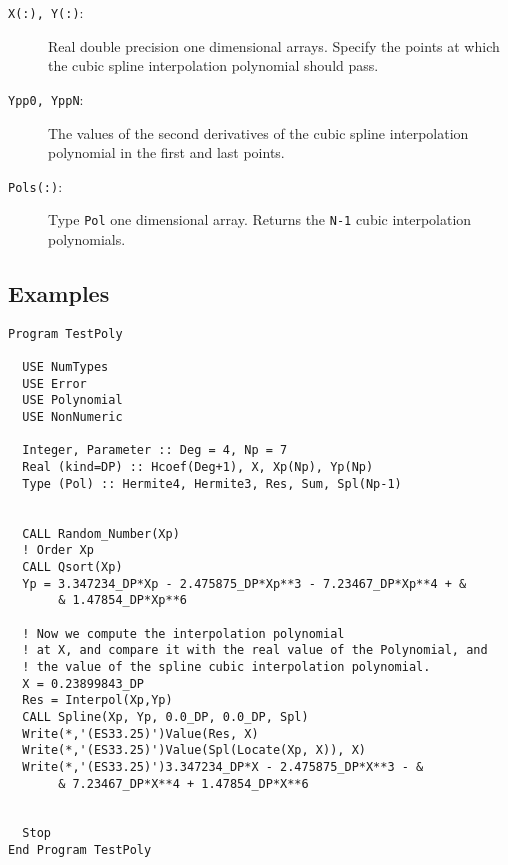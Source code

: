\begin{description}
\item[\texttt{X(:), Y(:)}:] Real double precision one dimensional
  arrays. Specify the points at which the cubic spline interpolation
  polynomial should pass. 
\item[\texttt{Ypp0, YppN}:] The values of the second derivatives of
  the cubic spline interpolation polynomial in the first and last points.
\item[\texttt{Pols(:)}:] Type \texttt{Pol} one dimensional
  array. Returns the \texttt{N-1} cubic interpolation polynomials.
\end{description}

\subsection{Examples}

\begin{lstlisting}[emph=Spline,
                   emphstyle=\color{blue},
                   frame=trBL,
                   caption=Computes the cubic spline interpolation polynomial.,
                   label=spline]
Program TestPoly

  USE NumTypes
  USE Error
  USE Polynomial
  USE NonNumeric

  Integer, Parameter :: Deg = 4, Np = 7
  Real (kind=DP) :: Hcoef(Deg+1), X, Xp(Np), Yp(Np)
  Type (Pol) :: Hermite4, Hermite3, Res, Sum, Spl(Np-1)


  CALL Random_Number(Xp)
  ! Order Xp
  CALL Qsort(Xp)
  Yp = 3.347234_DP*Xp - 2.475875_DP*Xp**3 - 7.23467_DP*Xp**4 + &
       & 1.47854_DP*Xp**6

  ! Now we compute the interpolation polynomial
  ! at X, and compare it with the real value of the Polynomial, and
  ! the value of the spline cubic interpolation polynomial.
  X = 0.23899843_DP
  Res = Interpol(Xp,Yp)
  CALL Spline(Xp, Yp, 0.0_DP, 0.0_DP, Spl)
  Write(*,'(ES33.25)')Value(Res, X)
  Write(*,'(ES33.25)')Value(Spl(Locate(Xp, X)), X)
  Write(*,'(ES33.25)')3.347234_DP*X - 2.475875_DP*X**3 - &
       & 7.23467_DP*X**4 + 1.47854_DP*X**6


  Stop
End Program TestPoly
\end{lstlisting}


